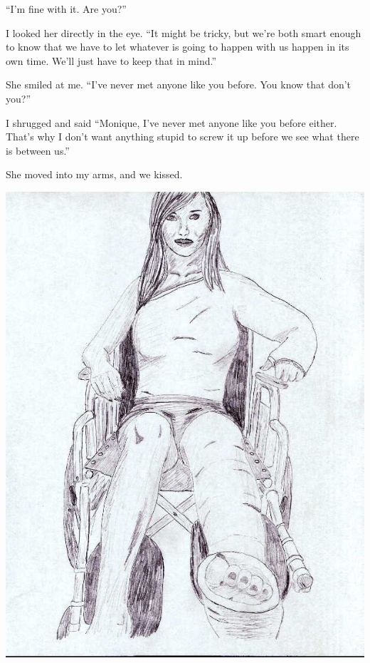 ``I'm fine with it. Are you?''

I looked her directly in the eye. ``It might be tricky, but we're both smart enough to
know that we have to let whatever is going to happen with us happen in its own time. We'll just
have to keep that in mind.''


She smiled at me. ``I've never met anyone like you before. You know that don't you?''

I shrugged and said ``Monique, I've never met anyone like you before either. That's why I
don't want anything stupid to screw it up before we see what there is between us.''

She moved into my arms, and we kissed.

\newpage
\begin{center}
\includegraphics{images/kicks28.jpg}
\end{center}
